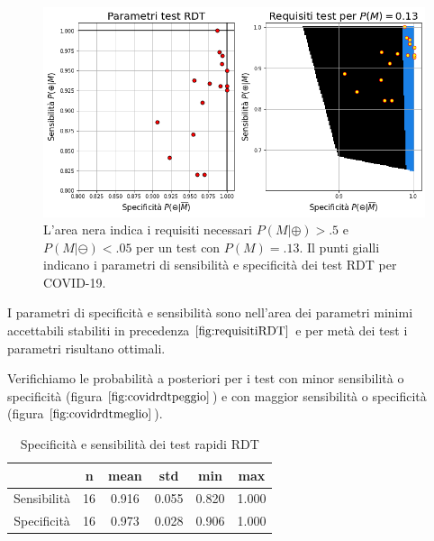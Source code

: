\documentclass[11pt]{article}
\begin{document}
    
    
        \begin{figure}
        \centering
            \includegraphics{requisitiRDT.png}
            \caption{L'area nera indica i requisiti necessari $P(M|\oplus)>.5$ e $P(M|\ominus)<.05$ per un test con $P(M)=.13$. Il punti gialli indicano i parametri di sensibilità e specificità dei test RDT per COVID-19.}
            \label{fig:requisitiRDT}
        \end{figure}

    
    I parametri di specificità e sensibilità sono nell'area dei parametri
minimi accettabili stabiliti in precedenza \(\ref{fig:requisitiRDT}\) e
per metà dei test i parametri risultano ottimali.

Verifichiamo le probabilità a posteriori per i test con minor
sensibilità o specificità (figura \(\ref{fig:covidrdtpeggio}\)) e con
maggior sensibilità o specificità (figura \(\ref{fig:covidrdtmeglio}\)).

    
\begin{table}
  \begin{center}
    \caption{Specificità e sensibilità dei test rapidi RDT}
    \label{tab:rdtstats}
    \begin{tabular}{c|c|c|c|c|c|}
        & n & mean & std & min & max \\
        \toprule
        Sensibilità & 16 & 0.916 & 0.055
        & 0.820 & 1.000 \\
        \midrule
        Specificità & 16 & 0.973 & 0.028
        & 0.906 & 1.000 \\
    \end{tabular}
  \end{center}
\end{table}
        

    
    
\end{document}
